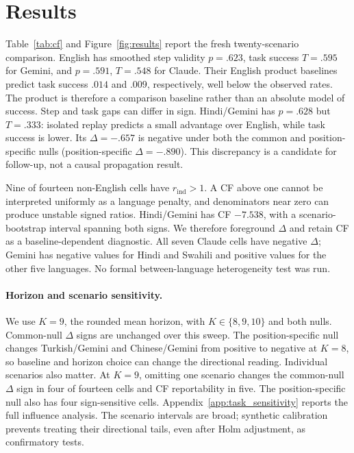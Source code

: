 \documentclass[11pt]{article}
\begin{document}
\section{Results}
\label{sec:results}
Table~\ref{tab:cf} and Figure~\ref{fig:results} report the fresh twenty-scenario
comparison. English has smoothed step validity $p=.623$, task success $T=.595$
for Gemini, and $p=.591$, $T=.548$ for Claude. Their English product
baselines predict task success $.014$ and $.009$, respectively, well below
the observed rates. The product is therefore a comparison baseline rather
than an absolute model of success. Step and task gaps can differ in sign. Hindi/Gemini has $p=.628$ but $T=.333$: isolated replay predicts a small
advantage over English, while task success is lower. Its $\Delta=-.657$ is
negative under both the common and position-specific nulls (position-specific
$\Delta=-.890$). This discrepancy is a candidate for follow-up, not a causal
propagation result.

Nine of fourteen non-English cells have $r_{\mathrm{ind}}>1$. A CF above one
cannot be interpreted uniformly as a language penalty, and denominators near
zero can produce unstable signed ratios. Hindi/Gemini has CF $-7.538$, with a
scenario-bootstrap interval spanning both signs. We therefore foreground
$\Delta$ and retain CF as a baseline-dependent diagnostic. All seven Claude
cells have negative $\Delta$; Gemini has negative values for Hindi and Swahili
and positive values for the other five languages. No formal between-language
heterogeneity test was run.




\paragraph{Horizon and scenario sensitivity.}
We use $K=9$, the rounded mean horizon, with $K\in\{8,9,10\}$ and both nulls.
Common-null $\Delta$ signs are unchanged over this sweep. The position-specific
null changes Turkish/Gemini and Chinese/Gemini from positive to negative at
$K=8$, so baseline and horizon choice can change the directional reading.
Individual scenarios also matter. At $K=9$, omitting one scenario changes
the common-null $\Delta$ sign in four of fourteen cells and CF reportability in
five. The position-specific null also has four sign-sensitive cells.
Appendix~\ref{app:task_sensitivity} reports the full influence analysis.
The scenario intervals are broad; synthetic calibration prevents treating
their directional tails, even after Holm adjustment, as confirmatory tests.
\end{document}
